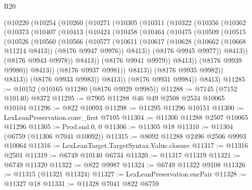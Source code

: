 \begin{lexlean}{R20}
\begin{coremodule}
{      (@10220
        (@10254
          (@10260
            (@10271
              (@10305
                (@10311
                  (@10322
                    (@10356
                      (@10362
                        (@10373
                          (@10407
                            (@10413
                              (@10424
                                (@10458
                                  (@10464
                                    (@10475
                                      (@10509
                                        (@10515
                                          (@10526
                                            (@10560
                                              (@10566
                                                (@10577
                                                  (@10611
                                                    (@10617
                                                      (@10628
                                                        (@10662 (@10668 @11214 @8413))
                                                        (@8176 @9947 @9976))
                                                      @8413))
                                                  (@8176 @9945 @9977))
                                                @8413))
                                            (@8176 @9943 @9978))
                                          @8413))
                                      (@8176 @9941 @9979))
                                    @8413))
                                (@8176 @9939 @9980))
                              @8413))
                          (@8176 @9937 @9981))
                        @8413))
                    (@8176 @9935 @9982))
                  @8413))
              (@8176 @9933 @9983))
            @8413))
        (@8176 @9931 @9984))
      @8413)
@11285 := @10152 (@10165 @11280 (@8176 @9929 @9985))
@11288 := @7145 (@7152 @10140) @8372
@11295 := @7905 @11288 @46 @49 @2508 @2534 @10065 @10104
@11296 := @822 @10093
@11298 := @11295 @11296 @10151
@11300 := LexLeanPreservation.conv_first @7105
@11304 := @11300 @11288 @2507 @10065 @11296
@11305 := Prod.snd.{0, 0}
@11306 := @11305 @18
@11310 := @11304 (@6759 (@11306 @7041 @10092))
@11315 := @8092 @11288 @2496 @2506 @9993 @10064
@11316 := LexLeanTarget.TargetSyntax.Value.closure
@11317 := @11316 @2501
@11319 := @6749 @10140 @6734
@11320 := @11317 @11319
@11321 := @6749 @11320
@11322 := @822 @9987
@11324 := @6749 @11322 @9108
@11326 := @11315 (@11321 @11324)
@11327 := LexLeanPreservation.encPair
@11328 := @11327 @18
@11331 := @11328 @7041 @822 @6759
}
\end{coremodule}
\end{lexlean}
